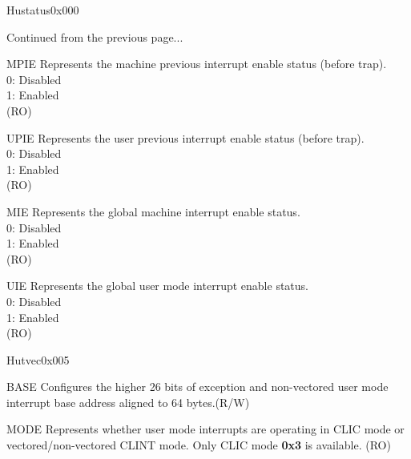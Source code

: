 \begin{register}{H}{ustatus}{0x000}
\begin{regdesc}\begin{reglist}
\item [Continued from the previous page...]
\label{fielddesc:USTATUSMPIE}\item [MPIE] Represents the machine previous interrupt enable status (before trap). \\
0: Disabled\\
1: Enabled\\
(RO)
\label{fielddesc:USTATUSUPIE}\item [UPIE] Represents the user previous interrupt enable status (before trap). \\
0: Disabled\\
1: Enabled\\
(RO)
\label{fielddesc:USTATUSMIE}\item [MIE] Represents the global machine interrupt enable status.\\
0: Disabled\\
1: Enabled\\
(RO)
\label{fielddesc:USTATUSUIE}\item [UIE] Represents the global user mode interrupt enable status. \\
0: Disabled\\
1: Enabled\\
(RO)
\end{reglist}\end{regdesc}
\end{register}

\begin{register}{H}{utvec}{0x005}\label{regdesc:UTVEC}
%
%
%
\regnewline%
\begin{regdesc}\begin{reglist}
\label{fielddesc:UTVECBASE}\item [BASE] Configures the higher 26 bits of exception and non-vectored user mode interrupt base address aligned to 64 bytes.(R/W)
\label{fielddesc:UTVECMODE}\item [MODE] Represents whether user mode interrupts are operating in CLIC mode or vectored/non-vectored CLINT mode. Only CLIC mode \textbf{0x3} is available. (RO)
\end{reglist}\end{regdesc}
\end{register}

